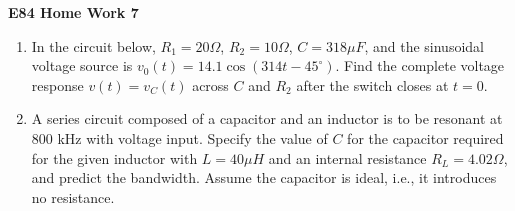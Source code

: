 \usepackage{html}

\begin{center}
{\Large \bf E84 Home Work 7}
\end{center}
\begin{enumerate}

\item In the circuit below, $R_1=20\Omega$, $R_2=10\Omega$, $C=318\mu F$,
and the sinusoidal voltage source is $v_0(t)=14.1 \cos(314 t-45^{\circ})$.
Find the complete voltage response $v(t)=v_C(t)$ across $C$ and $R_2$ after
the switch closes at $t=0$.



%


\item A series circuit composed of a capacitor and an inductor is to be 
resonant at 800 kHz with voltage input. Specify the value of $C$ for the 
capacitor required for the given inductor with $L=40\mu H$ and an internal 
resistance $R_L=4.02\Omega$, and predict the bandwidth. Assume the capacitor 
is ideal, i.e., it introduces no resistance.




\end{enumerate}
